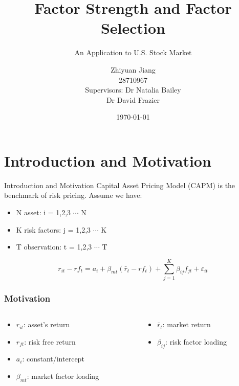 \documentclass[12pt]{beamer}
\title{Factor Strength and Factor Selection}
\subtitle{An Application to U.S. Stock Market}
\date{\today}
\author[author]{Zhiyuan Jiang\\
			                    28710967\\
[10mm]
			                    {\small Supervisors: Dr Natalia Bailey 
			                    	 \\\hspace{18.5mm} 
			                    	Dr David Frazier}}
\begin{document}
	
\frame{\titlepage}

\section{Introduction and Motivation}

\begin{frame}{Introduction and Motivation}
Capital Asset Pricing Model (CAPM) is the benchmark of risk pricing.
Assume we have:
\begin{itemize}
\item N asset: i = 1,2,3 $\cdots$ N
\item K risk factors: j = 1,2,3 $\cdots$ K
\item T observation: t = 1,2,3 $\cdots$ T
\end{itemize}
\[r_{it} - rf_{t} = a_i + \beta _{mt}(\bar{r}_{t} - rf_{t}) + \sum_{j=1}^{K}\beta_{ij}f_{jt} + \varepsilon_{it} \]
\frametitle{Motivation}
\begin{columns}
	\begin{column}{0.5\textwidth}
\begin{itemize}
\item $r_{it}$: asset's return
\item $r_{ft}$: risk free return
\item $a_i$: constant/intercept
\item $\beta_{mt}$: market factor loading
\end{itemize}
	\end{column}
	\begin{column}{0.5\textwidth}  
		\begin{center}
\begin{itemize}
\item $\bar{r}_{t}$: market return 
\item$\beta_{ij}$: risk factor loading

\end{itemize}
\end{center}
\end{column}
\end{columns}
\end{frame}
\end{document}
